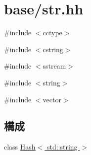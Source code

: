 \hypertarget{str_8hh}{
\section{base/str.hh}
\label{str_8hh}
}
{\ttfamily \#include $<$cctype$>$}\par
{\ttfamily \#include $<$cstring$>$}\par
{\ttfamily \#include $<$sstream$>$}\par
{\ttfamily \#include $<$string$>$}\par
{\ttfamily \#include $<$vector$>$}\par
\subsection*{構成}
\begin{DoxyCompactItemize}
\item 
class \hyperlink{classHash_3_01std_1_1string_01_4}{Hash$<$ std::string $>$}
\end{DoxyCompactItemize}
